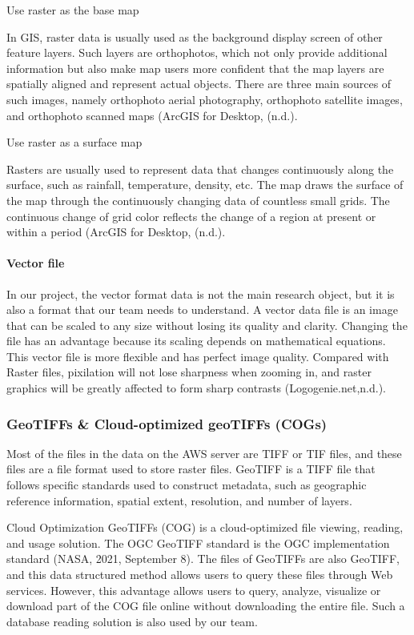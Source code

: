\documentclass[conference]{IEEEtran}
\newcommand{\subparagraph}{}
\begin{document}
\subparagraph{Use raster as the base map}

In GIS, raster data is usually used as the background display screen of other feature layers. Such layers are orthophotos, 
which not only provide additional information but also make map users more confident that the map layers are spatially 
aligned and represent actual objects. There are three main sources of such images, namely orthophoto aerial photography, 
orthophoto satellite images, and orthophoto scanned maps (ArcGIS for Desktop, (n.d.).

\subparagraph{Use raster as a surface map}

Rasters are usually used to represent data that changes continuously along the surface, such as rainfall, temperature, 
density, etc. The map draws the surface of the map through the continuously changing data of countless small grids. The 
continuous change of grid color reflects the change of a region at present or within a period (ArcGIS for Desktop, (n.d.).

\paragraph{Vector file}

In our project, the vector format data is not the main research object, but it is also a format that our team needs 
to understand. A vector data file is an image that can be scaled to any size without losing its quality and clarity. 
Changing the file has an advantage because its scaling depends on mathematical equations. This vector file is more 
flexible and has perfect image quality. Compared with Raster files, pixilation will not lose sharpness when zooming 
in, and raster graphics will be greatly affected to form sharp contrasts (Logogenie.net,n.d.).


\subsubsection{GeoTIFFs \& Cloud-optimized geoTIFFs (COGs)}

Most of the files in the data on the AWS server are TIFF or TIF files, and these files are a file format used to 
store raster files. GeoTIFF is a TIFF file that follows specific standards used to construct metadata, such as geographic 
reference information, spatial extent, resolution, and number of layers.

Cloud Optimization GeoTIFFs (COG) is a cloud-optimized file viewing, reading, and usage solution. The OGC GeoTIFF standard 
is the OGC implementation standard (NASA, 2021, September 8). The files of GeoTIFFs are also GeoTIFF, and this data structured 
method allows users to query these files through Web services. However, this advantage allows users to query, analyze, visualize 
or download part of the COG file online without downloading the entire file. Such a database reading solution is also used by our team.
\end{document}
